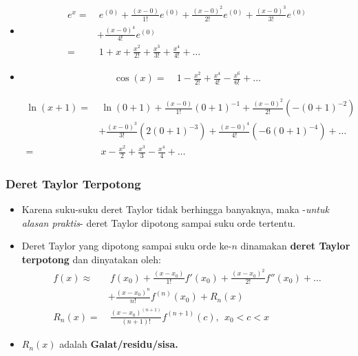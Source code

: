 \documentclass[pdflatex,compress]{beamer}
\begin{document}
\begin{frame}
	\begin{itemize}
		\item[]
		\begin{align*}
			e^x =&~ e^{(0)} + \frac{(x-0)}{1!}e^{(0)} + \frac{(x-0)^2}{2!}e^{(0)} + \frac{(x-0)^3}{3!}e^{(0)} \\
			&+ \frac{(x-0)^4}{4!}e^{(0)} \\
			=&~ 1 + x + \frac{x^2}{2!} + \frac{x^3}{3!} + \frac{x^4}{4!} + \dots
		\end{align*}
	\end{itemize}
\end{frame}

\begin{frame}
	\begin{itemize}
		\item[]
		\begin{align*}
			\cos(x) =&~ 1 - \frac{x^2}{2!} + \frac{x^4}{4!} - \frac{x^6}{6!} + \dots
		\end{align*}
	
		\begin{align*}
			\ln(x+1) =&~ \ln(0+1) + \frac{(x-0)}{1!}(0+1)^{-1} + \frac{(x-0)^2}{2!}(-(0+1)^{-2}) \\
			&+ \frac{(x-0)^3}{3!}(2(0+1)^{-3}) + \frac{(x-0)^4}{4!}(-6(0+1)^{-4}) + \dots \\
			=&~ x - \frac{x^2}{2} + \frac{x^3}{3} - \frac{x^4}{4} + \dots
		\end{align*}
	\end{itemize}
\end{frame}

\begin{frame}
	\frametitle{Deret Taylor Terpotong}
	\begin{itemize}
		\item Karena suku-suku deret Taylor tidak berhingga banyaknya, maka -\textit{untuk alasan praktis}- deret Taylor dipotong sampai suku orde tertentu.
		\item Deret Taylor yang dipotong sampai suku orde ke-$ n $ dinamakan \textbf{deret Taylor terpotong} dan dinyatakan oleh:
		\begin{align*}
			f(x) \approx&~f(x_0) + \frac{(x-x_0)}{1!}f'(x_0) + \frac{(x-x_0)^2}{2!}f''(x_0) + \dots \\
			& + \frac{(x-x_0)^n}{n!}f^(n)(x_0) + R_n(x) \\
			R_n(x) =&~ \frac{(x-x_0)^{(n+1)}}{(n+1)!}f^{(n+1)}(c),~~x_0 < c < x
		\end{align*}
		\item $ R_n(x) $ adalah \textbf{Galat/residu/sisa.}
	\end{itemize}
\end{frame}
\end{document}
